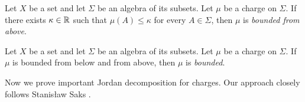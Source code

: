 \begin{definition}
    Let $X$ be a set and let $\Sigma$ be an algebra of its subsets. Let $\mu$ be a charge on $\Sigma$. If there exists $\kappa \in {\mathbb R}$ such that $\mu(A) \leq
        \kappa$ for every $A \in \Sigma$, then $\mu$ is \textit{bounded from above}.
\end{definition}

\begin{definition}
    Let $X$ be a set and let $\Sigma$ be an algebra of its subsets. Let $\mu$ be a charge on $\Sigma$. If $\mu$ is bounded from below and from above, then $\mu$ is \textit{bounded}.
\end{definition}
\noindent
Now we prove important Jordan decomposition for charges. Our approach closely follows Stanis{\l}aw Saks \cite{saks1937theory}.

